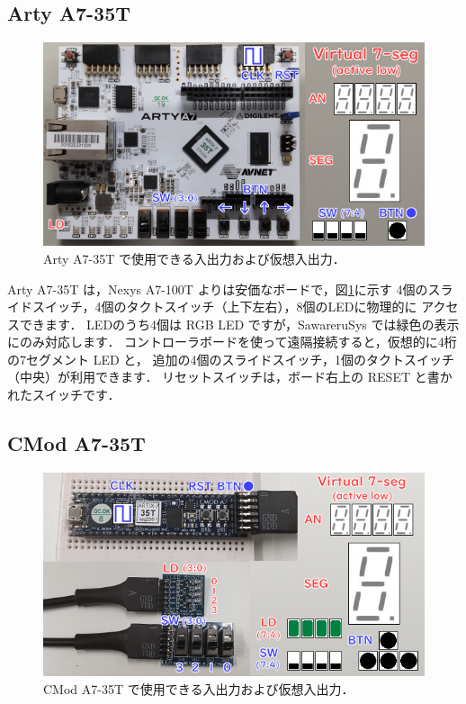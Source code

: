 \subsection{Arty A7-35T}

\begin{figure}[ht]
 \centering
 \includegraphics[width=90truemm]{figs/Arty.jpg}
 \caption{Arty A7-35T で使用できる入出力および仮想入出力．}
 \label{fig:Arty}
\end{figure}

Arty A7-35T は，Nexys A7-100T よりは安価なボードで，図\ref{fig:Arty}に示す
4個のスライドスイッチ，4個のタクトスイッチ（上下左右），8個のLEDに物理的に
アクセスできます．
LEDのうち4個は RGB LED ですが，SawareruSys では緑色の表示にのみ対応します．
コントローラボードを使って遠隔接続すると，仮想的に4桁の7セグメント LED と，
追加の4個のスライドスイッチ，1個のタクトスイッチ（中央）が利用できます．
リセットスイッチは，ボード右上の RESET と書かれたスイッチです．

\subsection{CMod A7-35T}

\begin{figure}[ht]
 \centering
 \includegraphics[width=90truemm]{figs/CMod.jpg}
 \caption{CMod A7-35T で使用できる入出力および仮想入出力．}
 \label{fig:CMod}
\end{figure}

